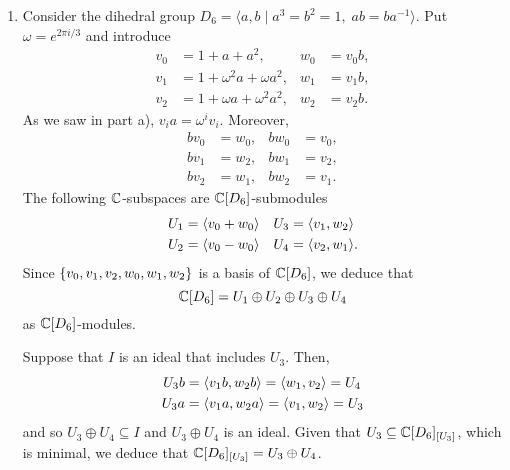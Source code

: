 \begin{xmpls}
\begin{enumerate}[\rm a)]
    \item Consider the dihedral group $D_6=\langle a,b \mid a^3=b^2=1,\;ab=ba^{-1}\rangle$. Put $\omega=e^{2\pi i/3}$ and introduce
    \begin{align*}
        v_0 &= 1 + a + a^2, &w_0 &=v_0b, \\
        v_1 &= 1 + \omega^2 a + \omega a^2, &w_1 &=v_1b, \\
        v_2 &= 1 + \omega a + \omega^2 a^2, &w_2 &=v_2b.
    \end{align*}
    As we saw in part a), $v_ia=\omega^iv_i$. Moreover,
    \begin{align*}
        bv_0 &= w_0, & bw_0 &= v_0, \\
        bv_1 &= w_2, & bw_1 &= v_2, \\
        bv_2 &= w_1, & bw_2 &= v_1.
    \end{align*}
    The following $\mathbb{C}$-subspaces are $\mathbb{C}[D_6]$-submodules
    \begin{align*}
        U_1 &=\langle v_0+w_0\rangle  &U_3 &= \langle v_1,w_2\rangle\\
        U_2 &=\langle v_0-w_0\rangle  &U_4 &= \langle v_2,w_1\rangle.
    \end{align*}
    Since $\{v_0,v_1,v_2,w_0,w_1,w_2\}$ is a basis of $\mathbb{C}[D_6]$, we deduce that
    $$
        \mathbb{C}[D_6] = U_1\oplus U_2\oplus U_3\oplus U_4
    $$
    as $\mathbb{C}[D_6]$-modules.
    
    Suppose that $I$ is an ideal that includes $U_3$. Then,
    \begin{align*}
        U_3b&=\langle v_1b,w_2b\rangle=\langle w_1,v_2\rangle=U_4\\
        U_3a&=\langle v_1a,w_2a\rangle=\langle v_1,w_2\rangle=U_3
    \end{align*}
    and so $U_3\oplus U_4\subseteq I$ and $U_3\oplus U_4$ is an ideal. Given that $U_3\subseteq\mathbb{C}[D_6]_{[U_3]}$, which is minimal, we deduce that $\mathbb{C}[D_6]_{[U_3]}=U_3\oplus U_4$.


\end{enumerate}
\end{xmpls}
